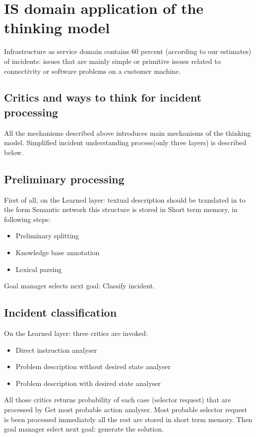 \documentclass{acm_proc_article-sp}
\begin{document}
\section{IS domain application of the thinking model}

Infrastructure as service domain contains 60 percent (according to our estimates) of incidents: issues that are mainly simple or primitive issues related to connectivity or software problems on a customer machine. 

\subsection{Critics and ways to think for incident processing}

All the mechanisms described above introduces main mechanisms of the thinking model. Simplified incident understanding process(only three layers) is described below.

\subsection{Preliminary processing}

First of all, on the Learned layer: textual description should be translated in to the form Semantic network this structure is stored in Short term memory, in following steps:

\begin{itemize}
  \item Preliminary splitting
  \item Knowledge base annotation
  \item Lexical parsing
\end{itemize}

Goal manager selects next goal: Classify incident.

\subsection{Incident classification}

On the Learned layer: three critics are invoked: 
\begin{itemize}
  \item Direct instruction analyser
  \item Problem description without desired state analyser
  \item Problem description with desired state analyser
\end{itemize}

All those critics returns probability of each case (selector request) that are processed by Get most probable action analyser. Most probable selector request is been processed immediately all the rest are stored in short term memory. Then goal manager select next goal: generate the solution.
\end{document}
